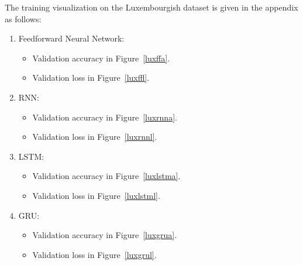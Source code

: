 The training visualization on the Luxembourgish dataset is given in the appendix
as follows:\\

\begin{enumerate}[label=\arabic*.]
  \item Feedforward Neural Network:
    \begin{itemize}
      \item Validation accuracy in Figure~\ref{luxffa}.
      \item Validation loss in Figure~\ref{luxffl}.
    \end{itemize}
  \item RNN:
    \begin{itemize}
      \item Validation accuracy in Figure~\ref{luxrnna}.
      \item Validation loss in Figure~\ref{luxrnnl}.
    \end{itemize}
  \item LSTM:
    \begin{itemize}
      \item Validation accuracy in Figure~\ref{luxlstma}.
      \item Validation loss in Figure~\ref{luxlstml}.
    \end{itemize}
  \item GRU:
    \begin{itemize}
      \item Validation accuracy in Figure~\ref{luxgrua}.
      \item Validation loss in Figure~\ref{luxgrul}.
    \end{itemize}
\end{enumerate}

